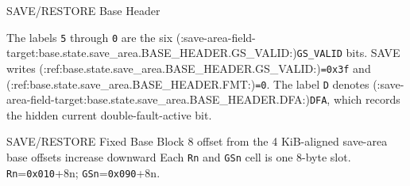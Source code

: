 \begin{BedrockListedFormatDiagram}{SAVE/RESTORE Base Header}
\end{BedrockListedFormatDiagram}
{\small The labels \texttt{5} through \texttt{0} are the six (:save-area-field-target:base.state.save_area.BASE_HEADER.GS_VALID:)\texttt{GS\_VALID} bits. SAVE writes
(:ref:base.state.save_area.BASE_HEADER.GS_VALID:)\texttt{=0x3f} and (:ref:base.state.save_area.BASE_HEADER.FMT:)\texttt{=0}. The label \texttt{D} denotes (:save-area-field-target:base.state.save_area.BASE_HEADER.DFA:)\texttt{DFA}, which records the hidden
current double-fault-active bit.\par}
\begin{BedrockListedStructLayout}
  {SAVE/RESTORE Fixed Base Block}
  {8}
  {offset from the 4 KiB-aligned save-area base}
  {offsets increase downward}
\BedrockStructFooter
  {Each \texttt{Rn} and \texttt{GSn} cell is one 8-byte slot.}
  {\texttt{Rn}=\texttt{0x010}+8n; \texttt{GSn}=\texttt{0x090}+8n.}
\end{BedrockListedStructLayout}
